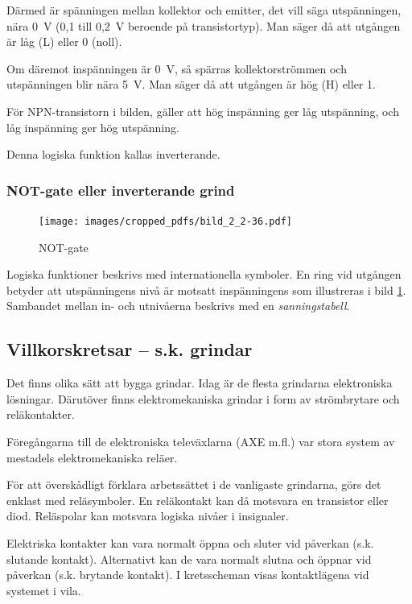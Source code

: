 Därmed är spänningen mellan kollektor och emitter, det vill säga utspänningen, nära 0~V
(0,1 till 0,2~V beroende på transistortyp). Man säger då att utgången är låg (L)
eller 0 (noll).

Om däremot inspänningen är 0~V, så spärras kollektorströmmen och utspänningen
blir nära 5~V. Man säger då att utgången är hög (H) eller 1.

För NPN-transistorn i bilden, gäller att hög inspänning ger låg utspänning,
och låg inspänning ger hög utspänning.

Denna logiska funktion kallas inverterande.

\subsubsection{NOT-gate eller inverterande grind}

\begin{figure}
\texttt{[image: images/cropped\_pdfs/bild\_2\_2-36.pdf]}
\caption{NOT-gate}
\label{fig:BildII2-36}
\end{figure}

Logiska funktioner beskrivs med internationella symboler.
En ring vid utgången betyder att utspänningens nivå är motsatt inspänningens
som illustreras i bild \ref{fig:BildII2-36}.
Sambandet mellan in- och utnivåerna beskrivs med en \emph{sanningstabell}.

\subsection{Villkorskretsar -- s.k. grindar}

Det finns olika sätt att bygga grindar. Idag är de flesta grindarna elektroniska
lösningar. Därutöver finns elektromekaniska grindar i form av strömbrytare och
reläkontakter.

Föregångarna till de elektroniska televäxlarna (AXE m.fl.) var stora system av
mestadels elektromekaniska reläer.

För att överskådligt förklara arbetssättet i de vanligaste grindarna, görs det
enklast med reläsymboler. En reläkontakt kan då motsvara en transistor eller
diod. Reläspolar kan motsvara logiska nivåer i insignaler.

Elektriska kontakter kan vara normalt öppna och sluter vid påverkan (s.k.
slutande kontakt). Alternativt kan de vara normalt slutna och öppnar vid
påverkan (s.k. brytande kontakt). I kretsscheman visas kontaktlägena vid
systemet i vila.

